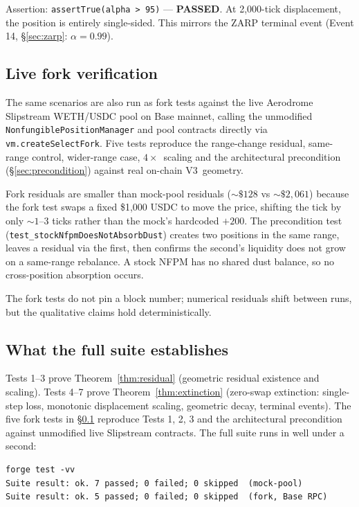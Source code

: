 \documentclass[11pt,a4paper]{article}
\begin{document}
Assertion: \texttt{assertTrue(alpha > 95)} --- \textbf{PASSED}. At 2{,}000-tick displacement, the position is entirely single-sided. This mirrors the ZARP terminal event (Event 14, \S\ref{sec:zarp}: $\alpha = 0.99$).

\subsection{Live fork verification}\label{sec:foundry-fork}

The same scenarios are also run as fork tests against the live Aerodrome Slipstream WETH/\allowbreak{}USDC pool on Base mainnet, calling the unmodified \texttt{Nonfungible\-Position\-Manager} and pool contracts directly via \texttt{vm.create\-Select\-Fork}. Five tests reproduce the range-change residual, same-range control, wider-range case, $4\times$~scaling and the architectural precondition (\S\ref{sec:precondition}) against real on-chain V3~geometry.

Fork residuals are smaller than mock-pool residuals (${\sim}\$128$ vs ${\sim}\$2{,}061$) because the fork test swaps a fixed \$1{,}000 USDC to move the price, shifting the tick by only ${\sim}1$--$3$ ticks rather than the mock's hardcoded $+200$. The precondition test (\texttt{test\_stock\-Nfpm\-Does\-Not\-Absorb\-Dust}) creates two positions in the same range, leaves a residual via the first, then confirms the second's liquidity does not grow on a same-range rebalance. A stock NFPM has no shared dust balance, so no cross-position absorption occurs.

The fork tests do not pin a block number; numerical residuals shift between runs, but the qualitative claims hold deterministically.

\subsection{What the full suite establishes}\label{sec:foundry-summary}

Tests 1--3 prove Theorem~\ref{thm:residual} (geometric residual existence and scaling). Tests 4--7 prove Theorem~\ref{thm:extinction} (zero-swap extinction: single-step loss, monotonic displacement scaling, geometric decay, terminal events). The five fork tests in \S\ref{sec:foundry-fork} reproduce Tests 1, 2, 3 and the architectural precondition against unmodified live Slipstream contracts. The full suite runs in well under a second:

\begin{verbatim}
forge test -vv
Suite result: ok. 7 passed; 0 failed; 0 skipped  (mock-pool)
Suite result: ok. 5 passed; 0 failed; 0 skipped  (fork, Base RPC)
\end{verbatim}
\end{document}
